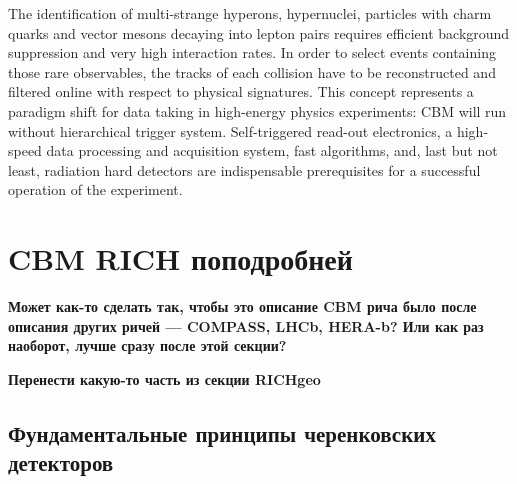 
The identification of multi-strange hyperons, hypernuclei, particles with charm quarks and vector mesons decaying into lepton pairs requires efficient background suppression and very high interaction rates. In order to select events containing those rare observables, the tracks of each collision have to be reconstructed and filtered online with respect to physical signatures. This concept represents a paradigm shift for data taking in high-energy physics experiments: CBM will run without hierarchical trigger system. Self-triggered read-out electronics, a high-speed data processing and acquisition system, fast algorithms, and, last but not least, radiation hard detectors are indispensable prerequisites for a successful operation of the experiment.



\section{CBM RICH поподробней}

\todo \textbf{Может как-то сделать так, чтобы это описание CBM рича было после описания других ричей --- COMPASS, LHCb, HERA-b? Или как раз наоборот, лучше сразу после этой секции?}

\todo \textbf{Перенести какую-то часть из секции RICHgeo}

\subsection{Фундаментальные принципы черенковских детекторов}

